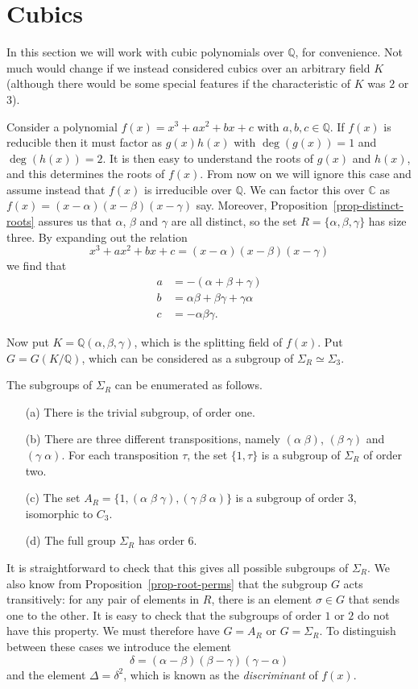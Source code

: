 \documentclass{amsart}
\newcommand{\Q}         {{\mathbb{Q}}}
\newcommand{\C}         {{\mathbb{C}}}
\newcommand{\al}        {\alpha}
\newcommand{\bt}        {\beta}
\newcommand{\gm}        {\gamma}
\newcommand{\dl}        {\delta}
\newcommand{\sg}        {\sigma}
\newcommand{\Dl}        {\Delta}
\newcommand{\Sg}        {\Sigma}
\renewcommand{\:}{\colon}
\theoremstyle{definition}
\begin{document}
\section{Cubics}
\label{sec-cubics}

In this section we will work with cubic polynomials over $\Q$, for
convenience.  Not much would change if we instead considered cubics
over an arbitrary field $K$ (although there would be some special
features if the characteristic of $K$ was $2$ or $3$).

Consider a polynomial $f(x)=x^3+ax^2+bx+c$ with $a,b,c\in\Q$.  If
$f(x)$ is reducible then it must factor as $g(x)h(x)$ with
$\deg(g(x))=1$ and $\deg(h(x))=2$.  It is then easy to understand the
roots of $g(x)$ and $h(x)$, and this determines the roots of $f(x)$.
From now on we will ignore this case and assume instead that $f(x)$ is
irreducible over $\Q$.  We can factor this over $\C$ as
$f(x)=(x-\al)(x-\bt)(x-\gm)$ say.  Moreover,
Proposition~\ref{prop-distinct-roots} assures us that $\al$, $\bt$ and
$\gm$ are all distinct, so the set $R=\{\al,\bt,\gm\}$ has size
three.  By expanding out the relation 
\[ x^3+ax^2+bx+c = (x-\al)(x-\bt)(x-\gm) \]
we find that 
\begin{align*}
 a &= -(\al+\bt+\gm) \\
 b &= \al\bt+\bt\gm+\gm\al \\
 c &= -\al\bt\gm.
\end{align*}

Now put $K=\Q(\al,\bt,\gm)$, which is the splitting field of $f(x)$.
Put $G=G(K/\Q)$, which can be considered as a subgroup of
$\Sg_R\simeq\Sg_3$.

The subgroups of $\Sg_R$ can be enumerated as follows.
\begin{itemize}
 \item[(a)] There is the trivial subgroup, of order one.
 \item[(b)] There are three different transpositions, namely
  $(\al\;\bt)$, $(\bt\;\gm)$ and $(\gm\;\al)$.  For each transposition
  $\tau$, the set $\{1,\tau\}$ is a subgroup of $\Sg_R$ of order two.
 \item[(c)] The set $A_R=\{1,(\al\;\bt\;\gm),(\gm\;\bt\;\al)\}$ is a
  subgroup of order $3$, isomorphic to $C_3$.
 \item[(d)] The full group $\Sg_R$ has order $6$.
\end{itemize}
It is straightforward to check that this gives all possible subgroups
of $\Sg_R$.  We also know from Proposition~\ref{prop-root-perms} that
the subgroup $G$ acts transitively: for any pair of elements in $R$,
there is an element $\sg\in G$ that sends one to the other.  It is
easy to check that the subgroups of order $1$ or $2$ do not have this
property.  We must therefore have $G=A_R$ or $G=\Sg_R$.  To
distinguish between these cases we introduce the element 
\[ \dl = (\al-\bt)(\bt-\gm)(\gm-\al) \]
and the element $\Dl=\dl^2$, which is known as the \emph{discriminant}
of $f(x)$.  
\end{document}
